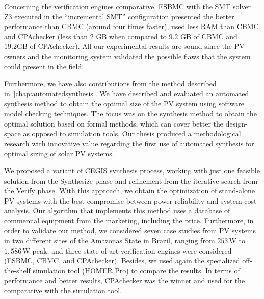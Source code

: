 %
Concerning the verification engines comparative, ESBMC with the SMT solver Z3 executed in the ``incremental SMT'' configuration presented the better performance than CBMC (around four times faster), used less RAM than CBMC and CPAchecker (less than $2$ GB when compared to $9.2$ GB of CBMC and 19.2GB of CPAchecker). All our experimental results are sound since the PV owners and the monitoring system validated the possible flaws that the system could present in the field.

Furthermore, we have also contributions from the method described in~\autoref{chap:automatedsynthesis}. We have described and evaluated an automated synthesis method to obtain the optimal size of the PV system using software model checking techniques. The focus was on the synthesis method to obtain the optimal solution based on formal methods, which can cover better the design-space as opposed to simulation tools. Our thesis produced a methodological research with innovative value regarding the first use of automated synthesis for optimal sizing of solar PV systems.

We proposed a variant of CEGIS synthesis process, working with just one feasible solution from the {\sc Synthesize} phase and refinement from the iterative search from the {\sc Verify} phase. With this approach, we obtain the optimization of stand-alone PV systems with the best compromise between power reliability and system cost analysis. Our algorithm that implements this method uses a database of commercial equipment from the marketing, including the price. Furthermore, in order to validate our method, we considered seven case studies from PV systems in two different sites of the Amazonas State in Brazil, ranging from $253$\,W to $1,586$\,W peak; and three state-of-art verification engines were considered (ESBMC, CBMC, and CPAchecker). Besides, we used again the specialized off-the-shelf simulation tool (HOMER Pro) to compare the results. In terms of performance and better results, CPAchecker was the winner and used for the comparative with the simulation tool.

